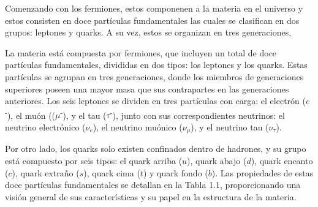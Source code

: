 Comenzando con los fermiones, estos componenen a la materia en el universo y estos consisten en doce partículas fundamentales las cuales se clasifican en dos grupos: leptones y quarks. A su vez, estos se organizan en tres generaciones,

La materia está compuesta por fermiones, que incluyen un total de doce partículas fundamentales, divididas en dos tipos: los leptones y los quarks. Estas partículas se agrupan en tres generaciones, donde los miembros de generaciones superiores poseen una mayor masa que sus contrapartes en las generaciones anteriores. Los seis leptones se dividen en tres partículas con carga: el electrón ($e$\textsuperscript{-}), el muón ((${\mu}$\textsuperscript{-}), y el tau (${\tau}$\textsuperscript{-}), junto con sus correspondientes neutrinos: el neutrino electrónico ($\nu_{e}$), el neutrino muónico ($\nu_{\mu}$), y el neutrino tau ($\nu_{\tau}$). 

Por otro lado, los quarks solo existen confinados dentro de hadrones, y su grupo está compuesto por seis tipos: el quark arriba ($u$), quark abajo ($d$), quark encanto ($c$), quark extraño ($s$), quark cima ($t$) y quark fondo ($b$). Las propiedades de estas doce partículas fundamentales se detallan en la Tabla 1.1, proporcionando una visión general de sus características y su papel en la estructura de la materia.

